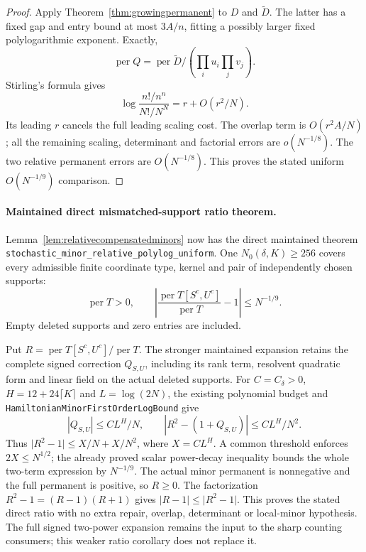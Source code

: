 \begin{proof}
Apply Theorem~\ref{thm:growingpermanent} to \(D\) and
\(\widetilde D\). The latter has a fixed gap and entry bound
at most \(3A/n\), fitting a possibly larger fixed
polylogarithmic exponent. Exactly,
\[
 \operatorname{per}Q=
                 \operatorname{per}\widetilde D/(\prod_i u_i\prod_jv_j).
\]
Stirling's formula gives
\[
 \log\frac{n!/n^n}{N!/N^N}=r+O(r^2/N).
\]
Its leading \(r\) cancels the full leading scaling cost.
The overlap term is \(O(r^2A/N)\); all the remaining scaling,
determinant and factorial errors are \(o(N^{-1/8})\).
The two relative permanent errors are \(O(N^{-1/8})\).
This proves the stated uniform \(O(N^{-1/9})\) comparison.
\end{proof}

\paragraph{Maintained direct mismatched-support ratio theorem.}
Lemma~\ref{lem:relativecompensatedminors} now has the direct
maintained theorem
\texttt{stochastic\_minor\_relative\_polylog\_uniform}.
One \(N_0(\delta,K)\geq256\) covers every admissible finite
coordinate type, kernel and pair of independently chosen supports:
\[
 \operatorname{per}T>0,\qquad
 \left|\frac{\operatorname{per}T[S^c,U^c]}
                 {\operatorname{per}T}-1\right|\leq N^{-1/9}.
\]
Empty deleted supports and zero entries are included.

Put \(R=\operatorname{per}T[S^c,U^c]/\operatorname{per}T\).
The stronger maintained expansion retains the complete signed
correction \(Q_{S,U}\), including its rank term, resolvent
quadratic form and linear field on the actual deleted supports.
For \(C=C_\delta>0\), \(H=12+24\lceil K\rceil\) and \(L=\log(2N)\),
the existing polynomial budget and
\texttt{HamiltonianMinorFirstOrderLogBound} give
\[
 |Q_{S,U}|\leq CL^H/N,\qquad
 |R^2-(1+Q_{S,U})|\leq CL^H/N^2.
\]
Thus \(\lvert R^2-1\rvert\leq X/N+X/N^2\), where \(X=CL^H\).
A common threshold enforces \(2X\leq N^{1/2}\);
the already proved scalar power-decay inequality bounds the
whole two-term expression by \(N^{-1/9}\).
The actual minor permanent is nonnegative and the full permanent
is positive, so \(R\geq0\). The factorization
\(R^2-1=(R-1)(R+1)\) gives
\(\lvert R-1\rvert\leq\lvert R^2-1\rvert\).
This proves the stated direct ratio with no extra repair,
overlap, determinant or local-minor hypothesis.
The full signed two-power expansion remains the input to the
sharp counting consumers; this weaker ratio corollary does not
replace it.
